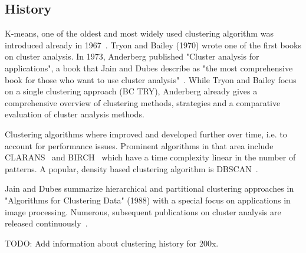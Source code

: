 \subsection{History}

K-means, one of the oldest and most widely used clustering algorithm was introduced already in 1967~\cite{MacQueen67kmeans, Meert06clustermaps}. Tryon and Bailey (1970) wrote one of the first books on cluster analysis. In 1973, Anderberg published "Cluster analysis for applications", a book that Jain and Dubes describe as "the most comprehensive book for those who want to use cluster analysis"~\cite{Jain88clustering}.  While Tryon and Bailey focus on a single clustering approach (BC TRY), Anderberg already gives a comprehensive overview of clustering methods, strategies and a comparative evaluation of cluster analysis methods.

Clustering algorithms where improved and developed further over time, i.e. to account for performance issues. Prominent algorithms in that area include CLARANS~\cite{Ng94CLARANS} and BIRCH~\cite{Zhang96BIRCH} which have a time complexity linear in the number of patterns. A popular, density based clustering algorithm is DBSCAN~\cite{Ester96DBSCAN}.

Jain and Dubes summarize hierarchical and partitional clustering approaches in "Algorithms for Clustering Data" (1988) with a special focus on applications in image processing. Numerous, subsequent publications on cluster analysis are released continuously~\cite{Jain99clusterreview}. 

TODO: Add information about clustering history for 200x.  

